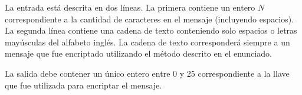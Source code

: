 \documentclass{oci}
\begin{document}
\begin{inputDescription}
    La entrada está descrita en dos líneas.
    La primera contiene un entero $N$ correspondiente a la cantidad de caracteres en el mensaje
    (incluyendo espacios).
    La segunda línea contiene una cadena de texto conteniendo solo espacios o letras mayúsculas
    del alfabeto inglés.
    La cadena de texto corresponderá siempre a un mensaje que fue encriptado utilizando el método
    descrito en el enunciado.

\end{inputDescription}

\begin{outputDescription}
    La salida debe contener un único entero entre 0 y 25 correspondiente a la llave que
    fue utilizada para encriptar el mensaje.
\end{outputDescription}

\begin{sampleDescription}
\end{sampleDescription}
\end{document}
